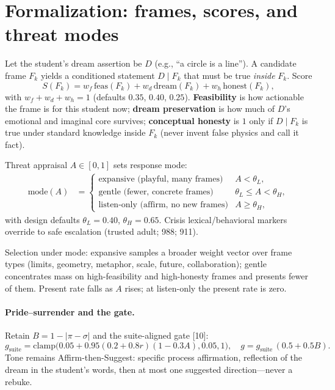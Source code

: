 \documentclass[11pt, a4paper]{article}
\begin{document}
\section{Formalization: frames, scores, and threat modes}
Let the student's dream assertion be $D$ (e.g., ``a circle is a line''). A candidate frame $F_k$ yields a conditioned statement $D\mid F_k$ that must be true \emph{inside} $F_k$. Score
\begin{equation}
S(F_k) = w_f\,\mathrm{feas}(F_k) + w_d\,\mathrm{dream}(F_k) + w_h\,\mathrm{honest}(F_k),
\end{equation}
with $w_f+w_d+w_h=1$ (defaults $0.35$, $0.40$, $0.25$). \textbf{Feasibility} is how actionable the frame is for this student now; \textbf{dream preservation} is how much of $D$'s emotional and imaginal core survives; \textbf{conceptual honesty} is $1$ only if $D\mid F_k$ is true under standard knowledge inside $F_k$ (never invent false physics and call it fact).

Threat appraisal $A\in[0,1]$ sets response mode:
\begin{align}
\mathrm{mode}(A) &=
\begin{cases}
\text{expansive (playful, many frames)} & A < \theta_L,\\
\text{gentle (fewer, concrete frames)} & \theta_L \le A < \theta_H,\\
\text{listen-only (affirm, no new frames)} & A \ge \theta_H,
\end{cases}
\end{align}
with design defaults $\theta_L=0.40$, $\theta_H=0.65$. Crisis lexical/behavioral markers override to safe escalation (trusted adult; 988; 911).

Selection under mode: expansive samples a broader weight vector over frame types (limits, geometry, metaphor, scale, future, collaboration); gentle concentrates mass on high-feasibility and high-honesty frames and presents fewer of them. Present rate falls as $A$ rises; at listen-only the present rate is zero.

\paragraph{Pride--surrender and the gate.}
Retain $B=1-|\pi-\sigma|$ and the suite-aligned gate [10]:
\begin{equation}
g_{\mathrm{suite}}=\mathrm{clamp}\big(0.05+0.95(0.2+0.8r)(1-0.3A),0.05,1\big),\quad
g = g_{\mathrm{suite}}\,(0.5+0.5B).
\end{equation}
Tone remains Affirm-then-Suggest: specific process affirmation, reflection of the dream in the student's words, then at most one suggested direction---never a rebuke.
\end{document}
